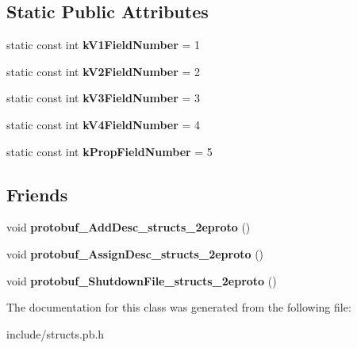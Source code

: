 \subsection*{Static Public Attributes}
\begin{DoxyCompactItemize}
\item 
\hypertarget{classstruct_definitions_1_1_block_af3c29e532c7fea0e23058773a6ba7f35}{}\label{classstruct_definitions_1_1_block_af3c29e532c7fea0e23058773a6ba7f35} 
static const int {\bfseries k\+V1\+Field\+Number} = 1
\item 
\hypertarget{classstruct_definitions_1_1_block_af95251ef5476d7317215011ef98b9523}{}\label{classstruct_definitions_1_1_block_af95251ef5476d7317215011ef98b9523} 
static const int {\bfseries k\+V2\+Field\+Number} = 2
\item 
\hypertarget{classstruct_definitions_1_1_block_ab22ce5bb8f88f768a62a57fe24c8c74d}{}\label{classstruct_definitions_1_1_block_ab22ce5bb8f88f768a62a57fe24c8c74d} 
static const int {\bfseries k\+V3\+Field\+Number} = 3
\item 
\hypertarget{classstruct_definitions_1_1_block_a491024fbe369b2d6ae1ab22c7934c1f6}{}\label{classstruct_definitions_1_1_block_a491024fbe369b2d6ae1ab22c7934c1f6} 
static const int {\bfseries k\+V4\+Field\+Number} = 4
\item 
\hypertarget{classstruct_definitions_1_1_block_a2dea57cc6b52adebaa2cf6696c668d5c}{}\label{classstruct_definitions_1_1_block_a2dea57cc6b52adebaa2cf6696c668d5c} 
static const int {\bfseries k\+Prop\+Field\+Number} = 5
\end{DoxyCompactItemize}
\subsection*{Friends}
\begin{DoxyCompactItemize}
\item 
\hypertarget{classstruct_definitions_1_1_block_abcf9b7cc173b6d79696d01156751b8ce}{}\label{classstruct_definitions_1_1_block_abcf9b7cc173b6d79696d01156751b8ce} 
void {\bfseries protobuf\+\_\+\+Add\+Desc\+\_\+structs\+\_\+2eproto} ()
\item 
\hypertarget{classstruct_definitions_1_1_block_adb32752ff5178cb902966da6e3cb3bc6}{}\label{classstruct_definitions_1_1_block_adb32752ff5178cb902966da6e3cb3bc6} 
void {\bfseries protobuf\+\_\+\+Assign\+Desc\+\_\+structs\+\_\+2eproto} ()
\item 
\hypertarget{classstruct_definitions_1_1_block_ac2e4278d7604361fa6502b1cfbf9d980}{}\label{classstruct_definitions_1_1_block_ac2e4278d7604361fa6502b1cfbf9d980} 
void {\bfseries protobuf\+\_\+\+Shutdown\+File\+\_\+structs\+\_\+2eproto} ()
\end{DoxyCompactItemize}


The documentation for this class was generated from the following file\+:\begin{DoxyCompactItemize}
\item 
include/structs.\+pb.\+h\end{DoxyCompactItemize}
